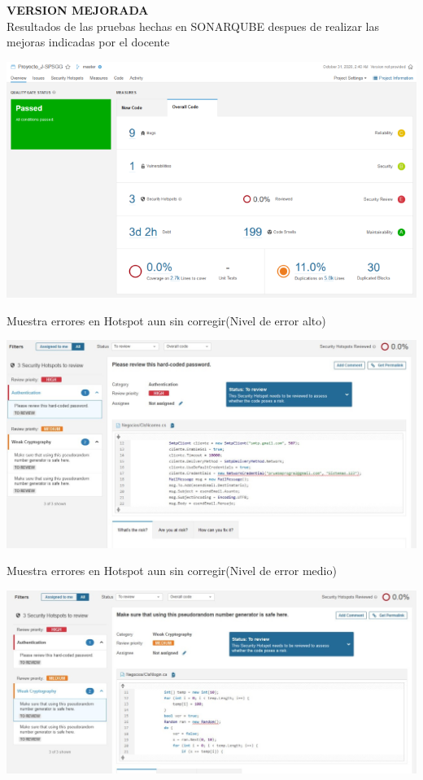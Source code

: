 \documentclass[12pt,letterpaper]{article}
\begin{document}
\textbf{VERSION MEJORADA}
\\
Resultados de las pruebas hechas en SONARQUBE despues de realizar las mejoras indicadas por el docente
\\
\begin{center}
	\includegraphics[width=15cm]{./img/image4.png} 
\end{center}
Muestra errores en Hotspot aun sin corregir(Nivel de error alto)
\\
\begin{center}
	\includegraphics[width=15cm]{./img/image5.jpg} 
\end{center}
Muestra errores en Hotspot aun sin corregir(Nivel de error medio)
\\
\begin{center}
	\includegraphics[width=15cm]{./img/image6.jpg} 
\end{center}
\end{document}
